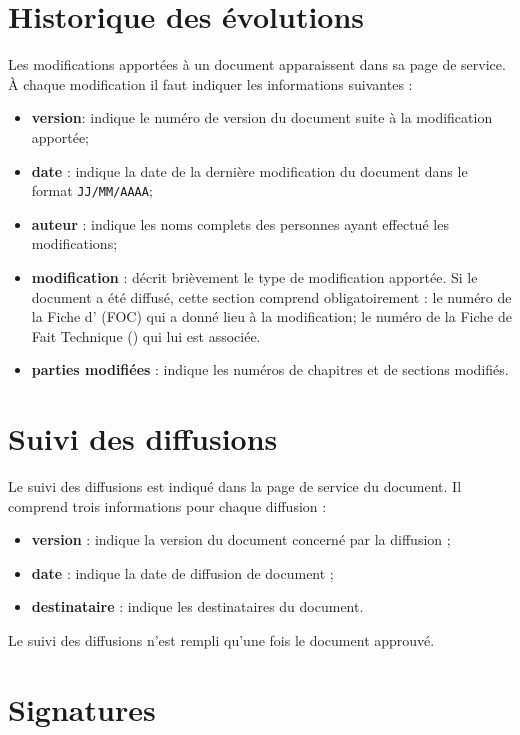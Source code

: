 
\section{Historique des évolutions}

Les modifications apportées à un document apparaissent dans sa page de service. À chaque modification il faut indiquer les informations suivantes :
\begin{itemize}
 \item \textbf{version}: indique le numéro de version du document suite à la modification apportée;
\item \textbf{date} : indique la date de la dernière modification du document dans le format \verb+JJ/MM/AAAA+;
\item \textbf{auteur} : indique les noms complets des personnes ayant effectué les modifications;
\item \textbf{modification} : décrit brièvement le type de modification apportée. Si le document a
été diffusé, cette section comprend obligatoirement :
	\subitem \textbullet{ }le numéro de la Fiche d'\OC{} (FOC) qui a donné lieu à la modification;
	\subitem \textbullet{ }le numéro de la Fiche de Fait Technique (\FFTCourt{}) qui lui est associée.
\item \textbf{parties modifiées} : indique les numéros de chapitres et de sections modifiés.
\end{itemize}

\section{Suivi des diffusions}

Le suivi des diffusions est indiqué dans la page de service du document. Il comprend trois informations pour chaque diffusion :
\begin{itemize}
\item \textbf{version} : indique la version du document concerné par la diffusion ;
\item  \textbf{date} : indique la date de diffusion de document ;
\item \textbf{destinataire} : indique les destinataires du document. 
\end{itemize}
 Le suivi des diffusions n’est rempli qu’une fois le document approuvé.

\section{Signatures}

